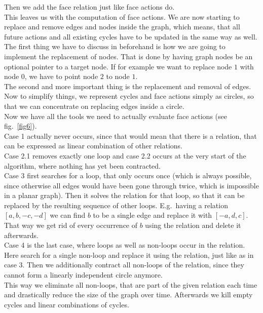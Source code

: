 \documentclass[11pt, a4paper, UKenglish]{article}
\begin{document}
    Then we add the face relation just like face actions do.\\
    This leaves us with the computation of face actions.
    We are now starting to replace and remove edges and nodes inside the graph, which means, that all future actions and all existing cycles have to be updated in the same way as well.
    The first thing we have to discuss in beforehand is how we are going to implement the replacement of nodes.
    That is done by having graph nodes be an optional pointer to a target node.
    If for example we want to replace node $1$ with node $0$, we have to point node $2$ to node $1$.\\
    The second and more important thing is the replacement and removal of edges.
    Now to simplify things, we represent cycles and face actions simply as circles, so that we can concentrate on replacing edges inside a circle.\\
    \newpage
    Now we have all the tools we need to actually evaluate face actions (see fig.\ \ref{fig6}).\\
    
    Case 1 actually never occurs, since that would mean that there is a relation, that can be expressed as linear combination of other relations.\\
    Case 2.1 removes exactly one loop and case 2.2 occurs at the very start of the algorithm, where nothing has yet been contracted.\\
    Case 3 first searches for a loop, that only occurs once (which is always possible, since otherwise all edges would have been gone through twice, which is impossible in a planar graph).
    Then it solves the relation for that loop, so that it can be replaced by the resulting sequence of other loops.
    E.g.\ having a relation $[a, b, -c, -d]$ we can find $b$ to be a single edge and replace it with $[-a, d, c]$.
    That way we get rid of every occurrence of $b$ using the relation and delete it afterwards.\\
    Case 4 is the last case, where loops as well as non-loops occur in the relation.
    Here search for a single non-loop and replace it using the relation, just like as in case 3.
    Then we additionally contract all non-loops of the relation, since they cannot form a linearly independent circle anymore.\\
    This way we eliminate all non-loops, that are part of the given relation each time and drastically reduce the size of the graph over time.
    Afterwards we kill empty cycles and linear combinations of cycles.
    
\end{document}
